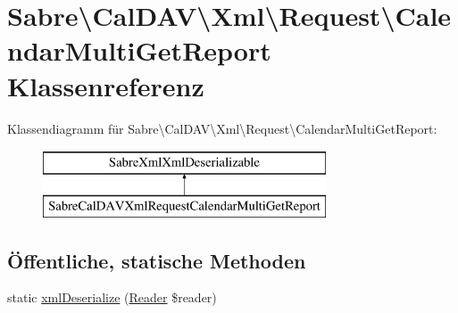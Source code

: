 \hypertarget{class_sabre_1_1_cal_d_a_v_1_1_xml_1_1_request_1_1_calendar_multi_get_report}{}\section{Sabre\textbackslash{}Cal\+D\+AV\textbackslash{}Xml\textbackslash{}Request\textbackslash{}Calendar\+Multi\+Get\+Report Klassenreferenz}
\label{class_sabre_1_1_cal_d_a_v_1_1_xml_1_1_request_1_1_calendar_multi_get_report}
Klassendiagramm für Sabre\textbackslash{}Cal\+D\+AV\textbackslash{}Xml\textbackslash{}Request\textbackslash{}Calendar\+Multi\+Get\+Report\+:\begin{figure}[H]
\begin{center}
\leavevmode
\includegraphics[height=2.000000cm]{class_sabre_1_1_cal_d_a_v_1_1_xml_1_1_request_1_1_calendar_multi_get_report}
\end{center}
\end{figure}
\subsection*{Öffentliche, statische Methoden}
\begin{DoxyCompactItemize}
\item 
static \mbox{\hyperlink{class_sabre_1_1_cal_d_a_v_1_1_xml_1_1_request_1_1_calendar_multi_get_report_a1a139508f2c505c2cf06dca45ad94d64}{xml\+Deserialize}} (\mbox{\hyperlink{class_sabre_1_1_xml_1_1_reader}{Reader}} \$reader)
\end{DoxyCompactItemize}
